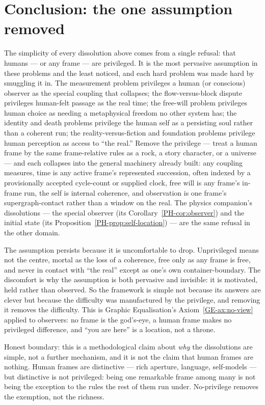 \documentclass[11pt,a4paper]{article}
\theoremstyle{remark}\newtheorem{remark}[definition]{Remark}
\begin{document}
\section{Conclusion: the one assumption removed}\label{sec:no-privilege}
The simplicity of every dissolution above comes from a single refusal: that humans ---
or any frame --- are privileged. It is the most pervasive assumption in these problems
and the least noticed, and each hard problem was made hard by smuggling it in. The
measurement problem privileges a human (or conscious) observer as the special coupling
that collapses; the flow-versus-block dispute privileges human-felt passage as the real
time; the free-will problem privileges human choice as needing a metaphysical freedom no
other system has; the identity and death problems privilege the human self as a persisting
soul rather than a coherent run; the reality-versus-fiction and foundation problems
privilege human perception as access to ``the real.'' Remove the privilege --- treat a
human frame by the same frame-relative rules as a rock, a story character, or a universe
--- and each collapses into the general machinery already built: any coupling measures,
time is any active frame's represented succession, often indexed by a provisionally
accepted cycle-count or supplied clock, free will is any frame's in-frame run, the self is
internal coherence, and observation is one frame's supergraph-contact rather than a window
on the real. The physics companion's dissolutions --- the special observer (its
Corollary~\ref{PH-cor:observer}) and the initial state (its
Proposition~\ref{PH-prop:self-location}) --- are the same refusal in the other domain.

The assumption persists because it is uncomfortable to drop. Unprivileged means not the
centre, mortal as the loss of a coherence, free only as any frame is free, and never in
contact with ``the real'' except as one's own container-boundary. The discomfort is why
the assumption is both pervasive and invisible: it is motivated, held rather than observed.
So the framework is simple not because its answers are clever but because the difficulty
was manufactured by the privilege, and removing it removes the difficulty. This is
Graphic Equalisation's Axiom~\ref{GE-ax:no-view} applied to observers: no frame is
the god's-eye, a human frame makes no privileged difference, and ``you are here'' is a location, not a throne.

Honest boundary: this is a methodological claim about \emph{why} the dissolutions are
simple, not a further mechanism, and it is not the claim that human frames are nothing.
Human frames are distinctive --- rich aperture, language, self-models --- but distinctive
is not privileged: being one remarkable frame among many is not being the exception to the
rules the rest of them run under. No-privilege removes the exemption, not the richness.
\end{document}
